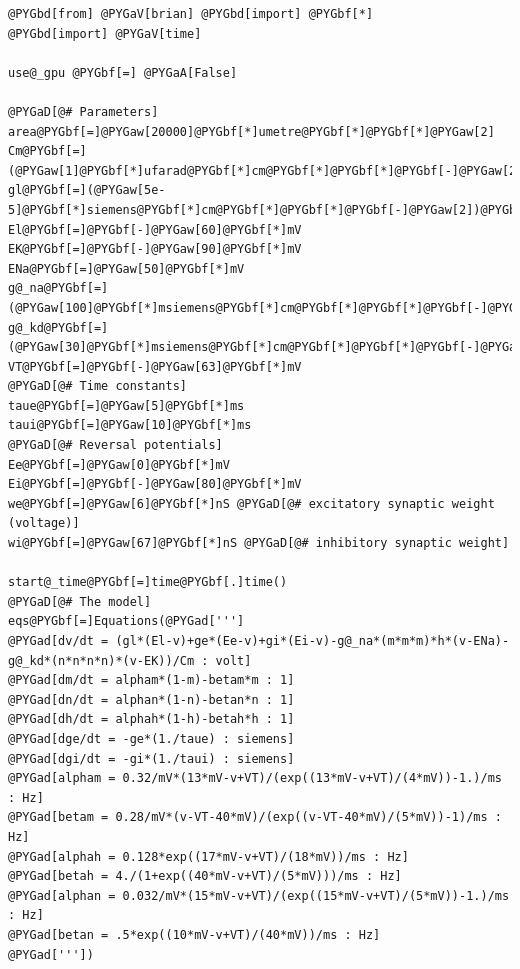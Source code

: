 \documentclass[letterpaper,10pt,english]{manual}
\begin{document}
\begin{Verbatim}[commandchars=@\[\]]
@PYGbd[from] @PYGaV[brian] @PYGbd[import] @PYGbf[*]
@PYGbd[import] @PYGaV[time]

use@_gpu @PYGbf[=] @PYGaA[False]

@PYGaD[@# Parameters]
area@PYGbf[=]@PYGaw[20000]@PYGbf[*]umetre@PYGbf[*]@PYGbf[*]@PYGaw[2]
Cm@PYGbf[=](@PYGaw[1]@PYGbf[*]ufarad@PYGbf[*]cm@PYGbf[*]@PYGbf[*]@PYGbf[-]@PYGaw[2])@PYGbf[*]area
gl@PYGbf[=](@PYGaw[5e-5]@PYGbf[*]siemens@PYGbf[*]cm@PYGbf[*]@PYGbf[*]@PYGbf[-]@PYGaw[2])@PYGbf[*]area
El@PYGbf[=]@PYGbf[-]@PYGaw[60]@PYGbf[*]mV
EK@PYGbf[=]@PYGbf[-]@PYGaw[90]@PYGbf[*]mV
ENa@PYGbf[=]@PYGaw[50]@PYGbf[*]mV
g@_na@PYGbf[=](@PYGaw[100]@PYGbf[*]msiemens@PYGbf[*]cm@PYGbf[*]@PYGbf[*]@PYGbf[-]@PYGaw[2])@PYGbf[*]area
g@_kd@PYGbf[=](@PYGaw[30]@PYGbf[*]msiemens@PYGbf[*]cm@PYGbf[*]@PYGbf[*]@PYGbf[-]@PYGaw[2])@PYGbf[*]area
VT@PYGbf[=]@PYGbf[-]@PYGaw[63]@PYGbf[*]mV
@PYGaD[@# Time constants]
taue@PYGbf[=]@PYGaw[5]@PYGbf[*]ms
taui@PYGbf[=]@PYGaw[10]@PYGbf[*]ms
@PYGaD[@# Reversal potentials]
Ee@PYGbf[=]@PYGaw[0]@PYGbf[*]mV
Ei@PYGbf[=]@PYGbf[-]@PYGaw[80]@PYGbf[*]mV
we@PYGbf[=]@PYGaw[6]@PYGbf[*]nS @PYGaD[@# excitatory synaptic weight (voltage)]
wi@PYGbf[=]@PYGaw[67]@PYGbf[*]nS @PYGaD[@# inhibitory synaptic weight]

start@_time@PYGbf[=]time@PYGbf[.]time()
@PYGaD[@# The model]
eqs@PYGbf[=]Equations(@PYGad[''']
@PYGad[dv/dt = (gl*(El-v)+ge*(Ee-v)+gi*(Ei-v)-g@_na*(m*m*m)*h*(v-ENa)-g@_kd*(n*n*n*n)*(v-EK))/Cm : volt]
@PYGad[dm/dt = alpham*(1-m)-betam*m : 1]
@PYGad[dn/dt = alphan*(1-n)-betan*n : 1]
@PYGad[dh/dt = alphah*(1-h)-betah*h : 1]
@PYGad[dge/dt = -ge*(1./taue) : siemens]
@PYGad[dgi/dt = -gi*(1./taui) : siemens]
@PYGad[alpham = 0.32/mV*(13*mV-v+VT)/(exp((13*mV-v+VT)/(4*mV))-1.)/ms : Hz]
@PYGad[betam = 0.28/mV*(v-VT-40*mV)/(exp((v-VT-40*mV)/(5*mV))-1)/ms : Hz]
@PYGad[alphah = 0.128*exp((17*mV-v+VT)/(18*mV))/ms : Hz]
@PYGad[betah = 4./(1+exp((40*mV-v+VT)/(5*mV)))/ms : Hz]
@PYGad[alphan = 0.032/mV*(15*mV-v+VT)/(exp((15*mV-v+VT)/(5*mV))-1.)/ms : Hz]
@PYGad[betan = .5*exp((10*mV-v+VT)/(40*mV))/ms : Hz]
@PYGad['''])


\end{Verbatim}
\end{document}
